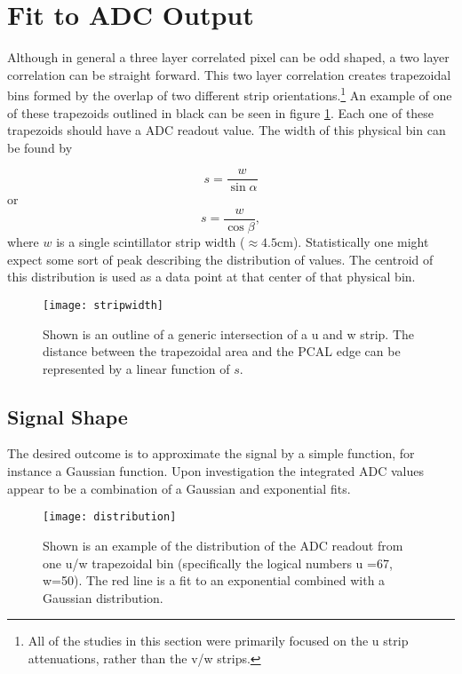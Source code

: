 \section{Fit to ADC Output}
Although in general a three layer correlated pixel can be odd shaped, a two layer correlation can be straight forward. This two layer correlation creates trapezoidal bins formed by the overlap of two different strip orientations.\footnote{All of the studies in this section were primarily focused on the u strip attenuations, rather than the v/w strips.}
An example of one of these trapezoids outlined in black can be seen in figure \ref{fig:stripwidth}. 
Each one of these trapezoids should have a ADC readout value.
The width of this physical bin can be found by

\begin{equation}
    s = \frac{w}{\sin{\alpha}}
    \label{eq:s}
\end{equation}
or
\begin{equation}
    s = \frac{w}{\cos{\beta}},
\end{equation}
where $w$ is a single scintillator strip width ($\approx 4.5$cm).
Statistically one might expect some sort of peak describing the distribution of values. 
The centroid of this distribution is used as a data point at that center of that physical bin.

\begin{figure}[h]
\centering
\texttt{[image: stripwidth]}
\caption{Shown is an outline of a generic intersection of a u and w strip. The distance between the trapezoidal area and the PCAL edge can be represented by a linear function of $s$.}
\label{fig:stripwidth}
\end{figure}

\FloatBarrier
\subsection{Signal Shape}
The desired outcome is to approximate the signal by a simple function, for instance a Gaussian function.
Upon investigation the integrated ADC values appear to be a combination of a Gaussian and exponential fits.

\begin{figure}[h]
    \centering
    \texttt{[image: distribution]}
    \caption{Shown is an example of the distribution of the ADC readout from one u/w trapezoidal bin (specifically the logical numbers u =67, w=50). The red line is a fit to an exponential combined with a Gaussian distribution.}
    \label{fig:distribution}
\end{figure}

